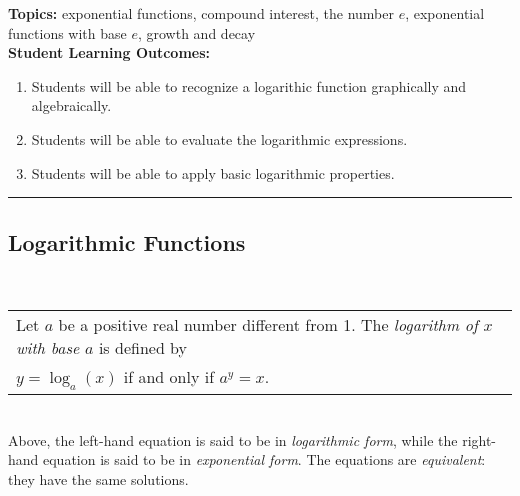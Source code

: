 

\noindent \textbf{Topics:}  exponential functions, compound interest, the number $e$, exponential functions with base $e$, growth and decay\\

\noindent \textbf{Student Learning Outcomes:}
\begin{enumerate}
\item Students will be able to recognize a logarithic function graphically and algebraically.
\item Students will be able to evaluate the logarithmic expressions.
\item Students will be able to apply basic logarithmic properties.
\end{enumerate}

\hrule 

\bigskip

\subsection{Logarithmic Functions} ~

\noindent\begin{tabular}{ | l  |} \hline
\noindent  Let $a$ be a positive real number different from 1. The \emph{logarithm of $x$ with base $a$} is defined by   \\
\hspace{1.5in} $y = \log_a(x)$    if and only if   $a^y=x$. \\  \hline
\end{tabular} \\

\noindent Above, the left-hand equation is said to be in
\emph{logarithmic form}, while the right-hand equation is said to be
in \emph{exponential form}. The equations are \emph{equivalent}: they
have the same solutions.


